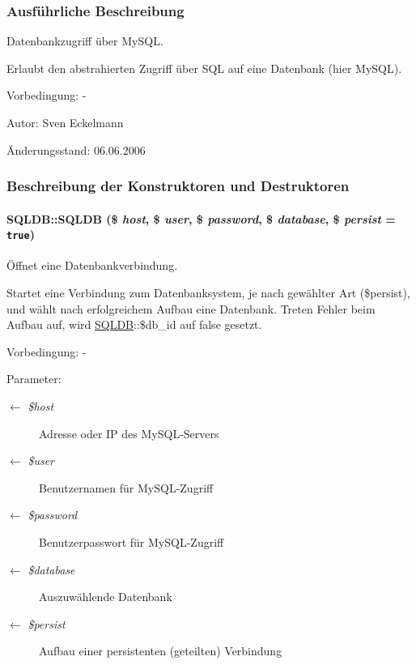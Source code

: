 \subsubsection{Ausf\"{u}hrliche Beschreibung}
Datenbankzugriff über My\-SQL. 

Erlaubt den abstrahierten Zugriff über SQL auf eine Datenbank (hier My\-SQL). \begin{Desc}
\item[Vorbedingung:]-\end{Desc}
\begin{Desc}
\item[Autor:]Sven Eckelmann \end{Desc}
\begin{Desc}
\item[Änderungsstand:]06.06.2006 \end{Desc}




\subsubsection{Beschreibung der Konstruktoren und Destruktoren}
\hypertarget{classSQLDB_069ba0502ed4bfedb72768a03ff6854d}{
\paragraph[SQLDB]{\setlength{\rightskip}{0pt plus 5cm}SQLDB::SQLDB (\$ {\em host}, \$ {\em user}, \$ {\em password}, \$ {\em database}, \$ {\em persist} = {\tt true})}\hfill}
\label{classSQLDB_069ba0502ed4bfedb72768a03ff6854d}


Öffnet eine Datenbankverbindung. 

Startet eine Verbindung zum Datenbanksystem, je nach gewählter Art (\$persist), und wählt nach erfolgreichem Aufbau eine Datenbank. Treten Fehler beim Aufbau auf, wird \hyperlink{classSQLDB}{SQLDB}::\$db\_\-id auf false gesetzt. \begin{Desc}
\item[Vorbedingung:]- \end{Desc}
\begin{Desc}
\item[Parameter:]
\begin{description}
\item[\mbox{$\leftarrow$} {\em \$host}]Adresse oder IP des My\-SQL-Servers \item[\mbox{$\leftarrow$} {\em \$user}]Benutzernamen für My\-SQL-Zugriff \item[\mbox{$\leftarrow$} {\em \$password}]Benutzerpasswort für My\-SQL-Zugriff \item[\mbox{$\leftarrow$} {\em \$database}]Auszuwählende Datenbank \item[\mbox{$\leftarrow$} {\em \$persist}]Aufbau einer persistenten (geteilten) Verbindung \end{description}
\end{Desc}


